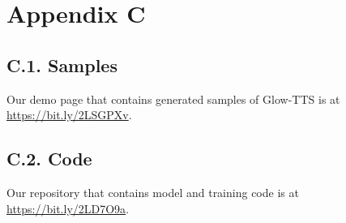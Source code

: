 \documentclass{article}
\begin{document}
\section*{Appendix C}
\subsection*{C.1. Samples}
Our demo page that contains generated samples of Glow-TTS is at \href{https://bit.ly/2LSGPXv}{https://bit.ly/2LSGPXv}.
\subsection*{C.2. Code}
Our repository that contains model and training code is at \href{https://bit.ly/2LD7O9a}{https://bit.ly/2LD7O9a}.
\end{document}
